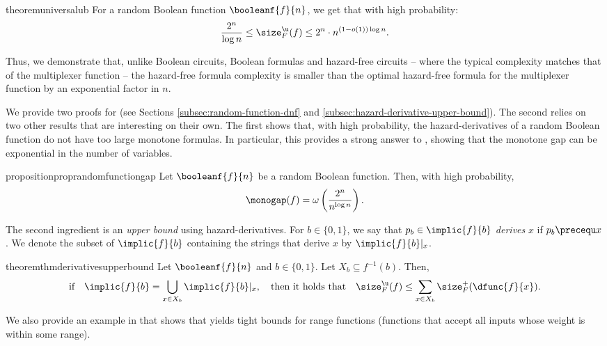 \documentclass[acmsmall, nonacm, authorversion]{acmart}
\begin{document}
\begin{restatable}{theorem}{universalub}
    \label{thm:universal-ub}
For a random Boolean function $\booleanf{f}{n}$, we get that with high probability:
\[
\frac{2^n}{\log n}\leq \size_{F}^\u(f)  \leq 2^n\cdot n^{(1-o(1))\log n}.
\]
\end{restatable}
Thus, we demonstrate that, unlike Boolean circuits, Boolean formulas and hazard-free circuits -- where the typical complexity matches that of the multiplexer function -- the hazard-free formula complexity is smaller than the optimal hazard-free formula for the multiplexer function by an exponential factor in $n$.

We provide two proofs for  (see Sections \ref{subsec:random-function-dnf} and \ref{subsec:hazard-derivative-upper-bound}). The second relies on two other results that are interesting on their own. The first shows that, with high probability, the hazard-derivatives of a random Boolean function do not have too large monotone formulas. In particular, this provides a strong answer to , showing that the monotone gap can be exponential in the number of variables.

\begin{restatable}{proposition}{proprandomfunctiongap}\label{prop:random-function-gap}
Let $\booleanf{f}{n}$ be a random Boolean function. Then, with high probability,
\[
\monogap(f)=\omega\left(\frac{2^n}{ n^{\log n}}\right).
\]
\end{restatable}

The second ingredient is an \emph{upper bound} using hazard-derivatives. For $b\in\{0,1\}$, we say that $p_{b}\in \implic{f}{b}$ \emph{derives} $x$ if $p_{b}\precequ x$. We denote the subset of $\implic{f}{b}$ containing the strings that derive $x$ by $\implic{f}{b}|_x$.

\begin{restatable}{theorem}{thmderivativesupperbound}\label{thm:derivative-upper-bound}
Let $\booleanf{f}{n}$ and $b\in\{0,1\}$. Let $X_b\subseteq f^{-1}(b)$. Then, 
\[
\text{if}\quad \implic{f}{b}=\bigcup_{x\in X_b}\implic{f}{b}|_x,
\quad \text{then it holds that}\quad 
\size_{F}^\u(f)\le \sum_{x\in X_b}\size_{F}^{+}(\dfunc{f}{x}).
\]
\end{restatable}
We also provide an example in   that shows that  yields tight bounds for range functions (functions that accept all inputs whose weight is within some range).
\end{document}
